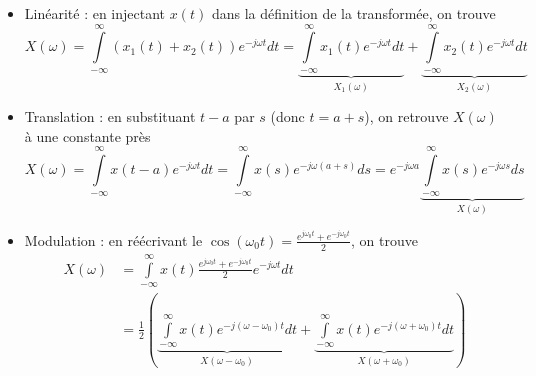 \documentclass [a4paper, 11pt] {article}
\begin{document}
    \begin{reponse}
        \begin{itemize}
            \item Linéarité : en injectant $x(t)$ dans la définition de la transformée, on trouve
            \begin{equation}
                X(\omega)= \int\limits_{-\infty}^\infty (x_1(t)+x_2(t)) e^{-j\omega t} dt = \underbrace{\int\limits_{-\infty}^\infty x_1(t) e^{-j\omega t} dt}_{X_1(\omega)} + \underbrace{\int\limits_{-\infty}^\infty x_2(t) e^{-j\omega t} dt}_{X_2(\omega)} 
            \end{equation}
            \item Translation : en substituant $t-a$ par $s$ (donc $t=a+s$), on retrouve $X(\omega)$ à une constante près
            \begin{equation}
                X(\omega)= \int\limits_{-\infty}^{\infty} x(t-a) e^{-j\omega t} dt = \int\limits_{-\infty}^{\infty} x(s) e^{-j\omega (a+s)} ds =  e^{-j\omega a} \underbrace{\int\limits_{-\infty}^{\infty} x(s) e^{-j\omega s} ds}_{X(\omega)}
            \end{equation}
            \item Modulation : en réécrivant le $\cos(\omega_0 t)=\frac{e^{j\omega_0 t}+e^{-j\omega_0 t}}{2}$, on trouve
            \begin{align}
                X(\omega) &= \int\limits_{-\infty}^\infty x(t)\frac{e^{j\omega_0 t}+e^{-j\omega_0 t}}{2}e^{-j\omega t} dt \\
                &= \frac{1}{2}\left(\underbrace{\int\limits_{-\infty}^\infty x(t) e^{-j(\omega-\omega_0) t} dt}_{X(\omega-\omega_0)} + \underbrace{\int\limits_{-\infty}^\infty x(t) e^{-j(\omega+\omega_0) t} dt}_{X(\omega+\omega_0)} \right)
            \end{align}
        \end{itemize}
    \end{reponse}
    
\end{document}
